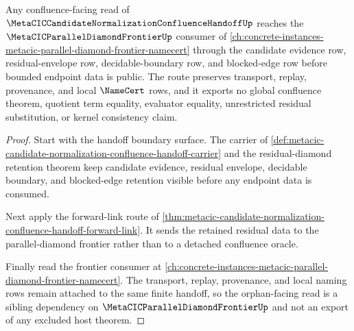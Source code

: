 \begin{theorem}
\label{thm:metacic-candidate-normalization-confluence-orphan-route}
Any confluence-facing read of $\MetaCICCandidateNormalizationConfluenceHandoffUp$ reaches the $\MetaCICParallelDiamondFrontierUp$ consumer of \autoref{ch:concrete-instances-metacic-parallel-diamond-frontier-namecert} through the candidate evidence row, residual-envelope row, decidable-boundary row, and blocked-edge row before bounded endpoint data is public. The route preserves transport, replay, provenance, and local $\NameCert$ rows, and it exports no global confluence theorem, quotient term equality, evaluator equality, unrestricted residual substitution, or kernel consistency claim.
\end{theorem}
\begin{proof}
Start with the handoff boundary surface. The carrier of \autoref{def:metacic-candidate-normalization-confluence-handoff-carrier} and the residual-diamond retention theorem keep candidate evidence, residual envelope, decidable boundary, and blocked-edge retention visible before any endpoint data is consumed.

Next apply the forward-link route of \autoref{thm:metacic-candidate-normalization-confluence-handoff-forward-link}. It sends the retained residual data to the parallel-diamond frontier rather than to a detached confluence oracle.

Finally read the frontier consumer at \autoref{ch:concrete-instances-metacic-parallel-diamond-frontier-namecert}. The transport, replay, provenance, and local naming rows remain attached to the same finite handoff, so the orphan-facing read is a sibling dependency on $\MetaCICParallelDiamondFrontierUp$ and not an export of any excluded host theorem.
\end{proof}
